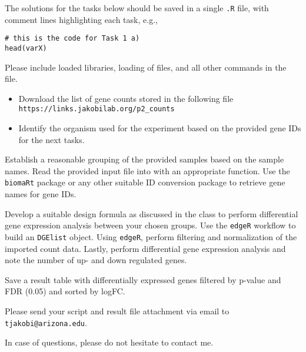 \documentclass[11pt,largemargins, letter]{homework}
\begin{document}
\maketitle

The solutions for the tasks below should be saved in a single \texttt{.R} file, with comment lines highlighting each task, e.g.,

\begin{verbatim}
# this is the code for Task 1 a)
head(varX)
\end{verbatim}

Please include loaded libraries, loading of files, and all other commands in the file.

\question

\begin{itemize}

    \item Download the list of gene counts stored in the following file \\\texttt{https://links.jakobilab.org/p2\_counts}
    \item Identify the organism used for the experiment based on the provided gene IDs for the next tasks.
\end{itemize}

  \begin{alphaparts}

    \questionpart Establish a reasonable grouping of the provided samples based on the sample names.
    \questionpart Read the provided input file into \faRProject \hspace{0.1mm} with an appropriate function.
    \questionpart Use the \texttt{biomaRt} package or any other suitable ID conversion package to retrieve gene names for gene IDs.
  \end{alphaparts}

\question

  \begin{alphaparts}
    \questionpart Develop a suitable design formula as discussed in the class to perform differential gene expression analysis between your chosen groups.
    \questionpart Use the \texttt{edgeR} workflow to build an \texttt{DGElist} object.
    \questionpart Using \texttt{edgeR}, perform filtering and normalization of the imported count data.
    \questionpart Lastly, perform differential gene expression analysis and note the number of up- and down regulated genes.
  \end{alphaparts}

\question

  \begin{alphaparts}
    \questionpart Save a result table with differentially expressed genes filtered by p-value and FDR (0.05) and sorted by logFC.
  \end{alphaparts}



Please send your \faRProject \hspace{0.1mm} script and result file attachment via email to \texttt{tjakobi@arizona.edu}.

In case of questions, please do not hesitate to contact me.
\end{document}
